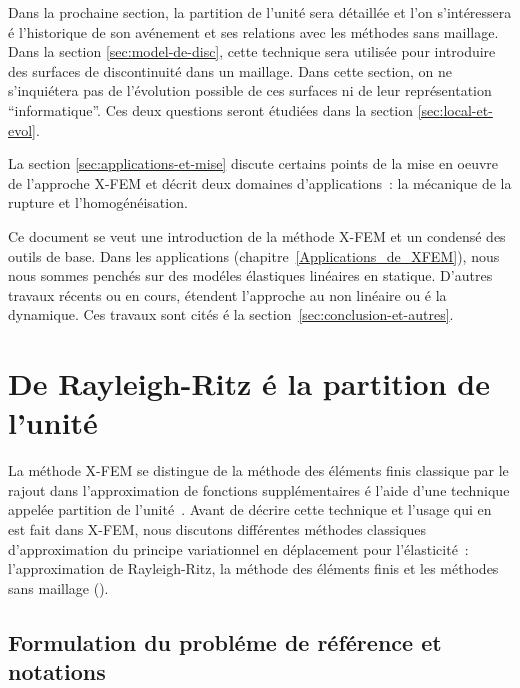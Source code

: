 Dans la prochaine section, la partition de l'unit\'e sera d\'etaill\'ee et
l'on s'int\'eressera \'e l'historique de son av\'enement et ses relations
avec les m\'ethodes sans maillage. Dans la section
\ref{sec:model-de-disc}, cette technique sera utilis\'ee pour
introduire des surfaces de discontinuit\'e dans un maillage. Dans
cette section, on ne s'inqui\'etera pas de l'\'evolution possible de ces
surfaces ni de leur repr\'esentation ``informatique''. Ces deux
questions seront \'etudi\'ees dans la section \ref{sec:local-et-evol}.

La section \ref{sec:applications-et-mise}
discute certains points de la mise
en oeuvre de l'approche X-FEM et d\'ecrit deux
domaines d'applications~:
la m\'ecanique de la rupture et l'homog\'en\'eisation.

Ce document se veut une introduction de la m\'ethode X-FEM
et un condens\'e des outils de base.
Dans les applications (chapitre~\ref{Applications_de_XFEM}), nous nous sommes pench\'es sur des
mod\'eles \'elastiques lin\'eaires en statique.
D'autres travaux r\'ecents ou en cours, \'etendent l'approche
au non lin\'eaire ou \'e la dynamique.
Ces travaux sont cit\'es \'e la section~\ref{sec:conclusion-et-autres}.





\section{De Rayleigh-Ritz \'e la partition de l'unit\'e}
\label{sec:la-partition-de}

La m\'ethode X-FEM se distingue de la m\'ethode des \'el\'ements finis
classique par le rajout dans l'approximation  de fonctions
suppl\'ementaires \'e l'aide d'une technique appel\'ee  partition de
l'unit\'e~\cite{Babuska:PUFEM}.  Avant de d\'ecrire cette technique
et l'usage qui en est fait dans X-FEM, nous discutons diff\'erentes
m\'ethodes classiques d'approximation du principe variationnel en
d\'eplacement pour l'\'elasticit\'e~:
l'approximation de Rayleigh-Ritz, la
m\'ethode des \'el\'ements finis et les m\'ethodes sans maillage
().

\subsection{Formulation  du probl\'eme de r\'ef\'erence et notations}\label{probleme_de_reference}

